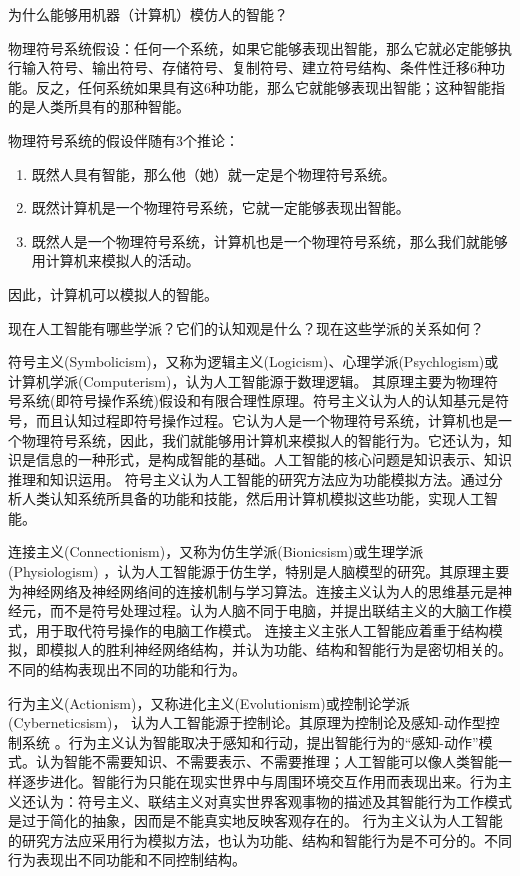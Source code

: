\begin{question}
为什么能够用机器（计算机）模仿人的智能？
\end{question}
\begin{solution}
物理符号系统假设：任何一个系统，如果它能够表现出智能，那么它就必定能够执行输入符号、输出符号、存储符号、复制符号、建立符号结构、条件性迁移6种功能。反之，任何系统如果具有这6种功能，那么它就能够表现出智能；这种智能指的是人类所具有的那种智能。\par
物理符号系统的假设伴随有3个推论：\par
	\begin{enumerate}
		\item 既然人具有智能，那么他（她）就一定是个物理符号系统。
		\item 既然计算机是一个物理符号系统，它就一定能够表现出智能。
		\item 既然人是一个物理符号系统，计算机也是一个物理符号系统，那么我们就能够用计算机来模拟人的活动。
	\end{enumerate} \par
因此，计算机可以模拟人的智能。
\end{solution}

\begin{question}
现在人工智能有哪些学派？它们的认知观是什么？现在这些学派的关系如何？
\end{question}
\begin{solution}
符号主义(Symbolicism)，又称为逻辑主义(Logicism)、心理学派(Psychlogism)或计算机学派(Computerism)，认为人工智能源于数理逻辑。 其原理主要为物理符号系统(即符号操作系统)假设和有限合理性原理。符号主义认为人的认知基元是符号，而且认知过程即符号操作过程。它认为人是一个物理符号系统，计算机也是一个物理符号系统，因此，我们就能够用计算机来模拟人的智能行为。它还认为，知识是信息的一种形式，是构成智能的基础。人工智能的核心问题是知识表示、知识推理和知识运用。 符号主义认为人工智能的研究方法应为功能模拟方法。通过分析人类认知系统所具备的功能和技能，然后用计算机模拟这些功能，实现人工智能。\par
连接主义(Connectionism)，又称为仿生学派(Bionicsism)或生理学派(Physiologism) ，认为人工智能源于仿生学，特别是人脑模型的研究。其原理主要为神经网络及神经网络间的连接机制与学习算法。连接主义认为人的思维基元是神经元，而不是符号处理过程。认为人脑不同于电脑，并提出联结主义的大脑工作模式，用于取代符号操作的电脑工作模式。 连接主义主张人工智能应着重于结构模拟，即模拟人的胜利神经网络结构，并认为功能、结构和智能行为是密切相关的。不同的结构表现出不同的功能和行为。\par
行为主义(Actionism)，又称进化主义(Evolutionism)或控制论学派(Cyberneticsism)， 认为人工智能源于控制论。其原理为控制论及感知-动作型控制系统 。行为主义认为智能取决于感知和行动，提出智能行为的“感知-动作”模式。认为智能不需要知识、不需要表示、不需要推理；人工智能可以像人类智能一样逐步进化。智能行为只能在现实世界中与周围环境交互作用而表现出来。行为主义还认为：符号主义、联结主义对真实世界客观事物的描述及其智能行为工作模式是过于简化的抽象，因而是不能真实地反映客观存在的。 行为主义认为人工智能的研究方法应采用行为模拟方法，也认为功能、结构和智能行为是不可分的。不同行为表现出不同功能和不同控制结构。
\end{solution}

